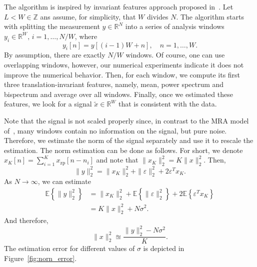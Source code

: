 \documentclass[journal]{IEEEtran}
\numberwithin{equation}{section}
\numberwithin{figure}{section}
\theoremstyle{plain}
\theoremstyle{definition}
\theoremstyle{remark}
\theoremstyle{plain}
\theoremstyle{remark}
\theoremstyle{plain}
\theoremstyle{plain}
\newcommand{\RN}{\mathbb{R}^N}
\newcommand{\E}[1]{\mathbb{E}\left\{{#1} \right\}}
\newcommand{\xz}{x_{\textrm{zp}}}
\begin{document}
The algorithm is inspired by invariant features approach proposed in~\cite{bendory2017bispectrum}. Let $L<W\in\mathbb{Z}$ ans assume, for simplicity, that $W$ divides $N$. The algorithm starts with splitting the measurement $y\in\RN$ into a series of analysis windows $y_i\in\mathbb{R}^W,\,i=1,\ldots,N/W$, where  
\begin{equation} \label{eq:analysis_window}
y_i[n] = y[(i-1)W + n] , \quad n=1,\ldots,W. 
\end{equation}
By assumption, there are exactly $N/W$ windows. Of course, one can use overlapping windows, however, our numerical experiments indicate it does not improve the numerical behavior.  Then, for each window, we compute its first three translation-invariant features, namely, mean, power spectrum and bispectrum and average over all windows. Finally, once we estimated these features, we look for a signal $\tilde{x}\in\mathbb{R}^W$ that is consistent with the data. 

Note that the signal is not scaled properly since, in contrast to the MRA model of~\cite{bendory2017bispectrum}, many windows contain no information on the signal, but pure noise. Therefore, we estimate the norm of the signal separately and use it to rescale the estimation. 
The norm estimation can be done as follows. For short, we denote $x_K[n]=\sum_{i=1}^K \xz[n-n_i]$ and note that $\|x_K\|_2^2 = K\|x\|_2^2$. 
Then,
\begin{equation}
\| y\|_2^2 =  \| x_K\|_2^2 + \|\varepsilon\|_2^2 + 2\varepsilon^Tx_K. 
\end{equation}  
As $N\to\infty$, we can estimate 
\begin{equation}
\begin{split}
\E{\| y\|_2^2} &=  \| x_K\|_2^2 + \E{\|\varepsilon\|_2^2} + 2\E{\varepsilon^Tx_K} \\ 
&= K\|x\|_2^2 + N\sigma^2. 
\end{split}	 
\end{equation}   
And therefore, 
\begin{equation} \label{eq:norm_estimation}
\|x\|_2^2 \approxeq \frac{\| y\|_2^2 - N\sigma^2}{K}. 
\end{equation}
The estimation error for different values of $\sigma$ is depicted in Figure~\ref{fig:norn_error}. 
\end{document}
